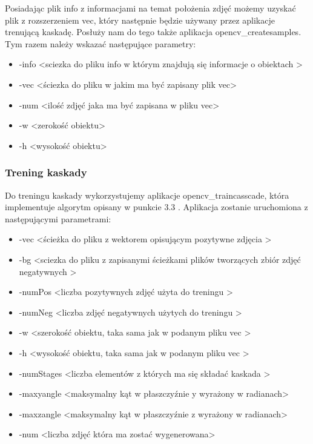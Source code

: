 \documentclass{article}
\numberwithin{equation}{section}
\begin{document}
Posiadając plik info z informacjami na temat położenia zdjęć możemy uzyskać plik z rozszerzeniem vec, który następnie będzie używany przez aplikacje trenującą kaskadę. Posłuży nam do tego także aplikacja opencv\_createsamples. Tym razem należy wskazać następujące parametry:

\begin{itemize}
    \item -info \textless sciezka do pliku info w którym znajdują się informacje o obiektach \textgreater
    \item -vec \textless ściezka do pliku w jakim ma być zapisany plik vec\textgreater
    \item -num \textless ilość zdjęć jaka ma być zapisana w pliku vec\textgreater
    \item -w \textless zerokość obiektu\textgreater
    \item -h \textless wysokość obiektu\textgreater

\end{itemize}

\subsubsection{Trening kaskady}

Do treningu kaskady wykorzystujemy aplikacje opencv\_traincasscade, która implementuje algorytm opisany w punkcie 3.3 . Aplikacja zostanie uruchomiona z następującymi parametrami:

\begin{itemize}
    \item -vec \textless ścieżka do pliku z wektorem opisującym pozytywne zdjęcia \textgreater
    \item -bg \textless sciezka do pliku z zapisanymi ścieżkami plików tworzących zbiór zdjęć negatywnych \textgreater
    \item -numPos \textless liczba pozytywnych zdjęć użyta do treningu \textgreater
    \item -numNeg \textless liczba zdjęć negatywnych użytych do treningu \textgreater
    \item -w \textless szerokość obiektu, taka sama jak w podanym pliku vec \textgreater
    \item -h \textless wysokość obiektu, taka sama jak w podanym pliku vec \textgreater
    \item -numStages \textless liczba elementów z których ma się składać kaskada \textgreater
    \item -maxyangle \textless maksymalny kąt w płaszczyźnie y wyrażony w radianach\textgreater
    \item -maxzangle \textless maksymalny kąt w płaszczyźnie z wyrażony w radianach\textgreater
    \item -num \textless liczba zdjęć która ma zostać wygenerowana>

\end{itemize}
\end{document}
